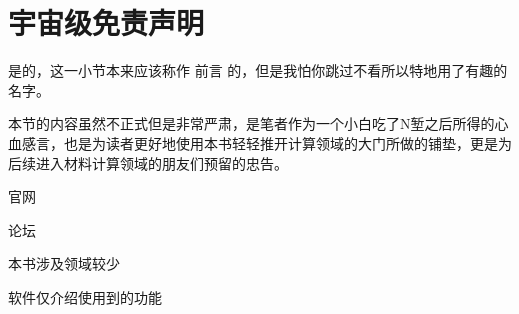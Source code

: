 \section{宇宙级免责声明}\label{sec:宇宙级免责声明}

是的，这一小节本来应该称作 前言 的，但是我怕你跳过不看所以特地用了有趣的名字。

本节的内容虽然不正式但是非常严肃，是笔者作为一个小白吃了N堑之后所得的心血感言，也是为读者更好地使用本书轻轻推开计算领域的大门所做的铺垫，更是为后续进入材料计算领域的朋友们预留的忠告。

官网

论坛

本书涉及领域较少

软件仅介绍使用到的功能